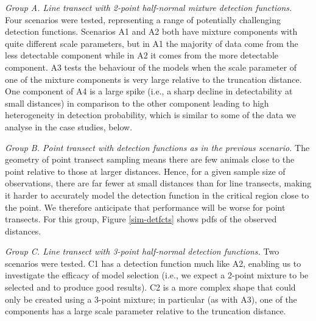 \documentclass[10pt]{article}
\begin{document}
\textit{Group A. Line transect with 2-point half-normal mixture detection functions.} Four scenarios were tested, representing a range of potentially challenging detection functions.  Scenarios A1 and A2 both have mixture components with quite different scale parameters, but in A1 the majority of data come from the less detectable component while in A2 it comes from the more detectable component.  A3 tests the behaviour of the models when the scale parameter of one of the mixture components is very large relative to the truncation distance. One component of A4 is a large spike (i.e., a sharp decline in detectability at small distances) in comparison to the other component leading to high heterogeneity in detection probability, which is similar to some of the data we analyse in the case studies, below.

\textit{Group B. Point transect with detection functions as in the previous scenario.} The geometry of point transect sampling means there are few animals close to the point relative to those at larger distances. Hence, for a given sample size of observations, there are far fewer at small distances than for line transects, making it harder to accurately model the detection function in the critical region close to the point.  We therefore anticipate that performance will be worse for point transects. For this group, Figure \ref{sim-detfcts} shows pdfs of the observed distances.

\textit{Group C. Line transect with 3-point half-normal detection functions.} Two scenarios were tested. C1 has a detection function much like A2, enabling us to investigate the efficacy of model selection (i.e., we expect a 2-point mixture to be selected and to produce good results). C2 is a more complex shape that could only be created using a 3-point mixture; in particular (as with A3), one of the components has a large scale parameter relative to the truncation distance.
\end{document}
